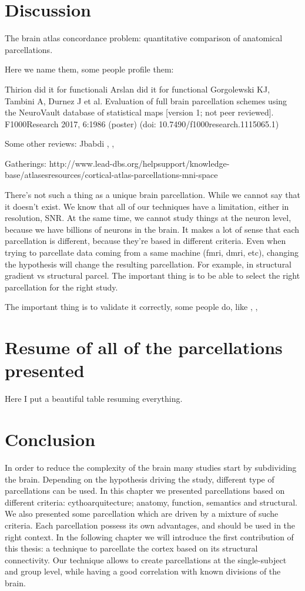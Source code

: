 \section{Discussion}
The brain atlas concordance problem: quantitative comparison of anatomical parcellations.

Here we name them, some people profile them:

Thirion did it for functionali \cite{Thirion2014}
Arslan did it for functional \cite{Arslan2018}
Gorgolewski KJ, Tambini A, Durnez J et al. Evaluation of full brain parcellation schemes using the NeuroVault database of statistical maps [version 1; not peer reviewed]. F1000Research 2017, 6:1986 (poster) (doi: 10.7490/f1000research.1115065.1) 

Some other reviews: Jbabdi \cite{Jbabdi2013}, \cite{Arslan2018}, 

Gatherings: http://www.lead-dbs.org/helpsupport/knowledge-base/atlasesresources/cortical-atlas-parcellations-mni-space


There's not such a thing as a unique brain parcellation. While we cannot say
that it doesn't exist. We know that all of our techniques have a limitation,
either in resolution, SNR. At the same time, we cannot study things at the
neuron level, because we have billions of neurons in the brain. It makes a
lot of sense that each parcellation is different, because they're based
in different criteria. Even when trying to parcellate data coming from a
same machine (fmri, dmri, etc), changing the hypothesis will change the 
resulting parcellation. For example, in structural gradient vs structural
parcel. The important thing is to be able to select the right parcellation
for the right study.

The important thing is to validate it correctly, some people do, like \cite{Gallardo}, \cite{Auzias2016}, \cite{ThiebautdeSchotten2014, ThiebautdeSchotten2016}

\section{Resume of all of the parcellations presented}
Here I put a beautiful table resuming everything.

\section{Conclusion}
In order to reduce the complexity of the brain many studies start by subdividing
the brain. Depending on the hypothesis driving the study, different type
of parcellations can be used. In this chapter we presented parcellations based
on different criteria: cythoarquitecture; anatomy, function, semantics and
structural. We also presented some parcellation which are driven by a mixture
of suche criteria. Each parcellation possess its own advantages, and should be
used in the right context. In the following chapter we will introduce the
first contribution of this thesis: a technique to parcellate the cortex based
on its structural connectivity. Our technique allows to create parcellations
at the single-subject and group level, while having a good correlation with
known divisions of the brain.


\chapterbib

